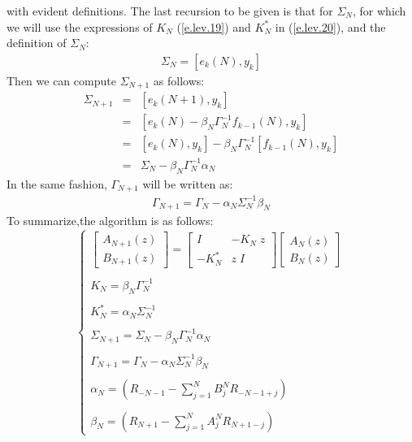 with evident definitions.
The last recursion to be given is that for $\Sigma_N$, for 
which we will use the expressions of $K_N$ (\ref{e.lev.19}) 
and $K^{*}_N$ in (\ref{e.lev.20}), 
and the definition of $\Sigma_N$:
\begin{eqnarray}
\Sigma_N=[e_k(N),y_k]
\label{e.lev.21}
\end{eqnarray}
Then we can compute $\Sigma_{N+1}$ as follows:
\begin{eqnarray}
\Sigma_{N+1}&=&[e_k(N+1),y_k] \nonumber \\
&=&[e_k(N)-\beta_N\Gamma^{-1}_Nf_{k-1}(N),y_k] \nonumber \\
&=&[e_k(N),y_k] - \beta_N\Gamma^{-1}_N[f_{k-1}(N),y_k] \nonumber \\
&=&\Sigma_N- \beta_N\Gamma^{-1}_N\alpha_N
\label{e.lev.22}
\end{eqnarray}
In the same fashion, $\Gamma_{N+1}$ will be written as:
\begin{eqnarray}
\Gamma_{N+1}=\Gamma_N- \alpha_N\Sigma^{-1}_N\beta_N
\label{e.lev.23}
\end{eqnarray}
 To summarize,the algorithm is as follows:
\\
\begin{equation}
\left\{ 
\begin{array}{l} 
 \left[ \begin{array}{c} 
 A_{N+1}(z) \\ 
 B_{N+1}(z) \end{array} \right]=\left[ \begin{array}{cc}  
 I & -K_N\; z \\
 -K^{*}_N & z\; I
 \end{array} \right]
 \left[ \begin{array}{c} 
 A_{N}(z) \\
 B_{N}(z)
 \end{array} \right] \\ \\
   K_N=\beta_N \Gamma^{-1}_N \\ \\
   K^{*}_N=\alpha_N \Sigma^{-1}_N \\ \\
   \Sigma_{N+1}=\Sigma_N- \beta_N\Gamma^{-1}_N\alpha_N \\ \\
   \Gamma_{N+1}=\Gamma_N- \alpha_N\Sigma^{-1}_N\beta_N \\ \\
   \alpha_N=(R_{-N-1}-\sum_{j=1}^NB^N_jR_{-N-1+j}) \\ \\ 
   \beta_N=(R_{N+1}-\sum_{j=1}^NA^N_jR_{N+1-j})
\end{array}
\right.
\label{e.lev.24}
\end{equation}
